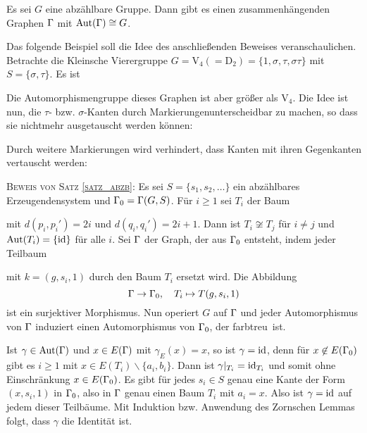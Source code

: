 \SATZ\label{satz_abzb} Es sei $G$ eine abzählbare Gruppe. Dann gibt es einen
zusammenhängenden Graphen $\Gamma$ mit $\mathrm{Aut}(\Gamma)\cong G$.

Das folgende Beispiel soll die Idee des anschließenden Beweises
veranschaulichen.
\BSP Betrachte die Kleinsche Vierergruppe
$G=\mathrm{V}_4(=\mathrm{D}_2)=\{1,\sigma,\tau,\sigma\tau\}$
mit $S=\{\sigma,\tau\}$.
Es ist
\begin{center}
\end{center}
Die Automorphismengruppe dieses Graphen ist aber größer als
$\mathrm{V}_4$. Die Idee ist nun, die $\tau$- bzw. $\sigma$-Kanten
durch \glqq Markierungen\grqq unterscheidbar zu machen,
so dass sie nichtmehr ausgetauscht werden können:
\begin{center}
\end{center}
Durch weitere Markierungen wird verhindert, dass Kanten mit ihren
Gegenkanten vertauscht werden:
\begin{center}
\end{center}

\textsc{Beweis von Satz \ref{satz_abzb}:}
Es sei $S=\{s_1, s_2, \ldots\}$ ein abzählbares Erzeugendensystem
und $\Gamma_0=\Gamma(G,S)$.
Für $i\geq 1$ sei $T_i$ der Baum
\begin{center}
\end{center}
mit $d(p_i,p_i')=2i$ und $d(q_i,q_i')=2i+1$.
Dann ist $T_i\not\cong T_j$ für $i\neq j$ und $\mathrm{Aut}(T_i)=\{\mathrm{id}\}$
für alle $i$. Sei $\Gamma$ der Graph, der aus $\Gamma_0$ entsteht, indem
jeder Teilbaum
\begin{center}
\end{center}
mit $k=(g,s_i,1)$ durch den Baum $T_i$ ersetzt wird.
Die Abbildung
\[
\Gamma\rightarrow\Gamma_0,\quad T_i\mapsto T(g,s_i,1)
\]
ist ein surjektiver Morphismus.
Nun operiert $G$ auf $\Gamma$ und jeder Automorphismus von $\Gamma$
induziert einen Automorphismus von $\Gamma_0$, der \glqq farbtreu\grqq\
ist.

Ist $\gamma\in\mathrm{Aut}(\Gamma)$ und $x\in E(\Gamma)$ mit $\gamma_E(x)=x$,
so ist $\gamma=\mathrm{id}$, denn für $x\not\in E(\Gamma_0)$ gibt es $i\geq 1$
mit $x\in E(T_i)\backslash\{a_i,b_i\}$.
Dann ist $\gamma|_{T_i}=\mathrm{id}_{T_i}$ und somit ohne Einschränkung
$x\in E(\Gamma_0)$. Es gibt für jedes $s_i\in S$ genau eine Kante der
Form $(x,s_i,1)$ in $\Gamma_0$, also in $\Gamma$ genau einen Baum $T_i$
mit $a_i=x$. Also ist $\gamma=\mathrm{id}$ auf jedem dieser Teilbäume.
Mit Induktion bzw. Anwendung des Zornschen Lemmas folgt, dass
$\gamma$ die Identität ist.

